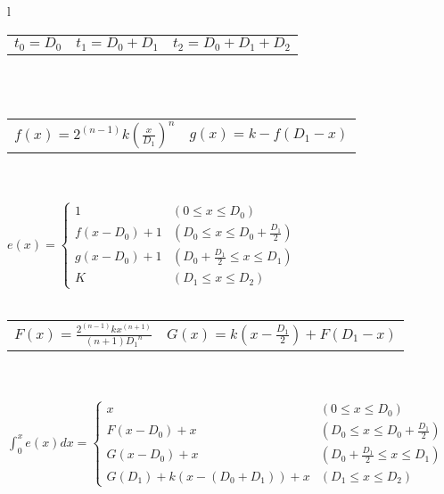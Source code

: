 \documentclass[
  border=2,
  convert={
    density=100 -alpha remove,
    outext=.png
  },
]{standalone}
\begin{document}
\begin{tabular}{l}
  \begin{tabular}{l l l}
    $\displaystyle t_0 = D_0$ &
    $\displaystyle t_1 = D_0 + D_1$ &
    $\displaystyle t_2 = D_0 + D_1 + D_2$
  \end{tabular}
  \\ \\
  \begin{tabular}{l l}
    $\displaystyle f(x) = 2^{(n-1)} k \left(\frac{x}{D_1}\right)^{n}$ &
    $\displaystyle g(x) = k - f(D_1 - x)$
  \end{tabular}
  \\ \\
  $
    \displaystyle e(x) = \begin{cases}
      1
        & (0 \leq x \leq D_0) \\
      f(x - D_0) + 1
        & \left(D_0 \leq x \leq D_0 + \frac{D_1}{2}\right) \\
      g(x - D_0) + 1
        & \left(D_0 + \frac{D_1}{2} \leq x \leq D_1\right) \\
      K
        & (D_1 \leq x \leq D_2)
    \end{cases}
  $
  \\ \\
  \begin{tabular}{l l}
    $\displaystyle F(x) = \frac{2^{(n-1)}kx^{(n+1)}}{(n+1){D_1}^{n}}$ &
    $\displaystyle G(x) = k\left(x - \frac{D_1}{2}\right) + F(D_1-x)$
  \end{tabular}
  \\ \\
  $
    \displaystyle \int_0^x e(x) dx = \begin{cases}
      x              
        & (0  \leq x \leq D_0) \\
      F(x - D_0) + x
        & \left(D_0 \leq x \leq D_0 + \frac{D_1}{2}\right) \\
      G(x - D_0) + x
        & \left(D_0 + \frac{D_1}{2} \leq x \leq D_1\right) \\
      G(D_1) + k(x - (D_0 + D_1)) + x
        & (D_1 \leq x \leq D_2)
    \end{cases}
  $ 
\end{tabular}
\end{document}
